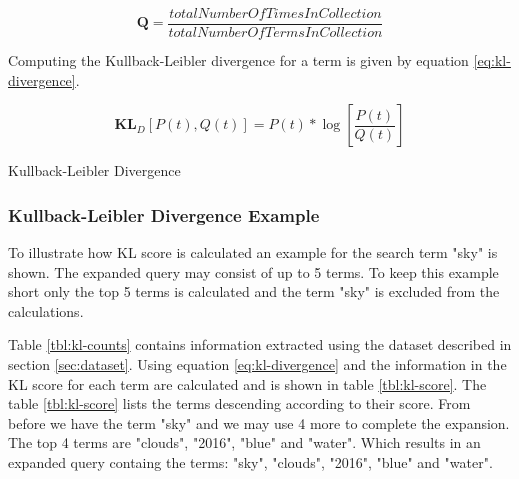 \begin{cequation}[H]
	\begin{equation}
		\mathbf{Q} = \frac{totalNumberOfTimesInCollection}{totalNumberOfTermsInCollection}
	\end{equation}
	\caption{}
  \label{eq:kl-distribution-q}
\end{cequation}

Computing the Kullback-Leibler divergence for a term is given by equation \ref{eq:kl-divergence}.

\begin{cequation}[H]
	\begin{equation}
		\mathbf{KL}_D[P(t), Q(t)] = P(t)*\log{[\frac{P(t)}{Q(t)}]}
	\end{equation}
	\caption{Kullback-Leibler Divergence}
  \label{eq:kl-divergence}
\end{cequation}

\subsubsection{Kullback-Leibler Divergence Example}
To illustrate how KL score is calculated an example for the search term "sky" is shown.
The expanded query may consist of up to 5 terms.
To keep this example short only the top 5 terms is calculated and the term "sky" is excluded from the calculations.

Table \ref{tbl:kl-counts} contains information extracted using the dataset described in section \ref{sec:dataset}.
Using equation \ref{eq:kl-divergence} and the information in the KL score for each term are calculated and is shown in table \ref{tbl:kl-score}.
The table \ref{tbl:kl-score} lists the terms descending according to their score.
From before we have the term "sky" and we may use 4 more to complete the expansion.
The top 4 terms are "clouds", "2016", "blue" and "water".
Which results in an expanded query containg the terms: "sky", "clouds", "2016", "blue" and "water".


